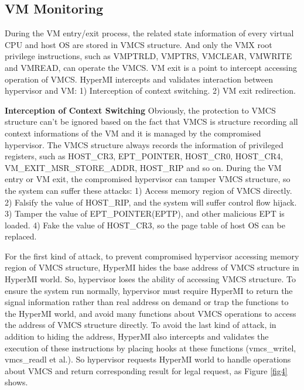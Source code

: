 \documentclass[conference]{IEEEtran}
\begin{document}
\subsection{VM Monitoring}

During the VM entry/exit process, the related state information of every virtual CPU and host OS are stored in VMCS structure. 
And only the VMX root privilege instructions, such as VMPTRLD, VMPTRS, VMCLEAR, VMWRITE and VMREAD, can operate the VMCS.
VM exit is a point to intercept accessing operation of VMCS. HyperMI intercepts and validates interaction between hypervisor and VM: 1) Interception of context switching. 2) VM exit redirection.

\textbf{Interception of Context Switching}
Obviously, the protection to VMCS structure can't be ignored based on the fact that VMCS is structure recording all context informations of the VM and it is managed by the compromised hypervisor. 
The VMCS structure always records the information of privileged registers, such as HOST\_CR3, EPT\_POINTER, HOST\_CR0, HOST\_CR4, VM\_EXIT\_MSR\_STORE\_ADDR, HOST\_RIP and so on. During the VM entry or VM exit, the compromised hypervisor can tamper VMCS structure, so the system can suffer these attacks: 1) Access memory region of VMCS directly. 2) Falsify the value of HOST\_RIP, and the system will suffer control flow hijack. 3) Tamper the value of EPT\_POINTER(EPTP), and other malicious EPT is loaded. 4) Fake the value of HOST\_CR3, so the page table of host OS can be replaced.

For the first kind of attack, to prevent compromised hypervisor accessing memory region of VMCS structure, HyperMI hides the base address of VMCS structure in HyperMI world. So, hypervisor loses the ability of accessing VMCS structure. To ensure the system run normally, hypervisor must require HyperMI to return the signal information rather than real address on demand or trap the functions to the HyperMI world, and avoid many functions about VMCS operations to access the address of VMCS structure directly. To avoid the last kind of attack, in addition to hiding the address, HyperMI also intercepts and validates the execution of these instructions by placing hooks at these functions (vmcs\_writel, vmcs\_readl et al.). So hypervisor requests HyperMI world to handle operations about VMCS and return corresponding result for legal request, as Figure \ref{fig4} shows.
\end{document}
